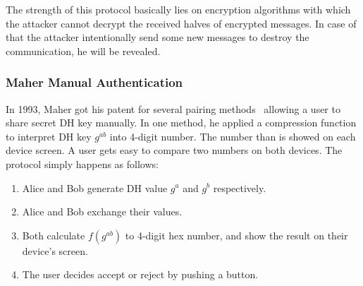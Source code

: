 The strength of this protocol basically lies on encryption algorithms with which the attacker cannot decrypt the received halves of encrypted messages. In case of that the attacker intentionally send some new messages to destroy the communication, he will be revealed. 

\subsubsection{Maher Manual Authentication}

In 1993, Maher got his patent for several pairing methods~\cite{maher} allowing a user to share secret DH key manually. In one method, he applied a compression function to interpret DH key $g^{ab}$ into 4-digit number. The number than is showed on each device screen. A user gets easy to compare two numbers on both devices. The protocol simply happens as follows: 
\begin{enumerate}
\item Alice and Bob generate DH value $g^a$ and $g^b$ respectively. 
\item Alice and Bob exchange their values. 
\item Both calculate $f(g^{ab})$ to 4-digit hex number, and show the result on their device's screen. 
\item The user decides accept or reject by pushing a button. 
\end{enumerate}

\begin{center}
\end{center}

